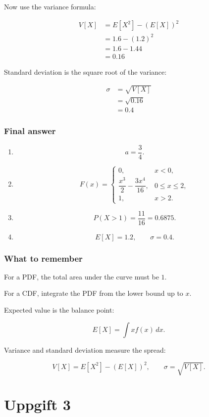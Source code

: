 \documentclass[10pt]{article}
\begin{document}
Now use the variance formula:

\begin{align*}
V[X]
&=
E[X^2]-(E[X])^2 \\[2mm]
&=
1.6-(1.2)^2 \\[2mm]
&=
1.6-1.44 \\[2mm]
&=0.16
\end{align*}

Standard deviation is the square root of the variance:

\begin{align*}
\sigma
&=
\sqrt{V[X]} \\[2mm]
&=
\sqrt{0.16} \\[2mm]
&=0.4
\end{align*}

\subsubsection*{Final answer}
\begin{enumerate}[label=\alph*)]
\item
\[
a=\frac{3}{4}.
\]

\item
\[
F(x)=
\begin{cases}
0,
& x<0,\\
\dfrac{x^3}{2}
-\dfrac{3x^4}{16},
& 0\leq x\leq 2,\\
1,
& x>2.
\end{cases}
\]

\item
\[
P(X>1)=\frac{11}{16}=0.6875.
\]

\item
\[
E[X]=1.2,
\qquad
\sigma=0.4.
\]
\end{enumerate}

\subsubsection*{What to remember}
For a PDF, the total area under the curve must be $1$.

For a CDF, integrate the PDF from the lower bound up to $x$.

Expected value is the balance point:

\[
E[X]=\int x f(x)\,dx.
\]

Variance and standard deviation measure the spread:

\[
V[X]=E[X^2]-(E[X])^2,
\qquad
\sigma=\sqrt{V[X]}.
\]

\section*{Uppgift 3}
\end{document}
